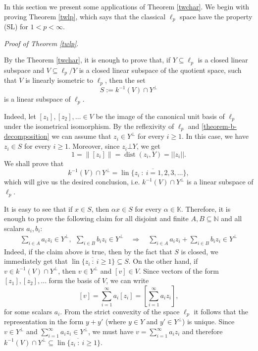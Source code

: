 \documentclass[12pt, reqno]{amsart}
\theoremstyle{definition}
\theoremstyle{remark}
\numberwithin{equation}{section}
\DeclareMathOperator{\dist}{dist}
\DeclareMathOperator{\lin}{lin}
\begin{document}
In this section we present some applications of Theorem \ref{twchar}. We begin with proving Theorem \ref{twlp}, which says that the classical $\ell_p$ space have the property (SL) for $1 < p < \infty$.

\emph{Proof of Theorem \ref{twlp}}.

By the Theorem \ref{twchar},  it is enough to prove that, if $Y \subseteq \ell_p$ is a closed linear subspace and $V \subseteq \ell_p/Y$ is a closed linear subspace of the quotient space, such that $V$ is linearly isometric to $\ell_p$, then the set 
$$S:=k^{-1}(V) \cap Y^{\perp}$$
is a linear subspace of $\ell_p$. 

Indeed, let $[z_1], [z_2], \ldots \in V$ be the image of the canonical unit basis of $\ell_p$ under the isometrical isomorphism. By the reflexivity of $\ell_p$ and \eqref{theorem-b-decomposition} we can assume that $z_i \in Y^{\perp}$ for every $i \geq 1$. In this case, we have $z_i \in S$ for every $i \geq 1$. Moreover, since $z_i\bot Y$, we get
$$1=\big\|[z_i]\big\|=\dist(z_i, Y) = ||z_i||.$$
We shall prove that 
$$k^{-1}(V) \cap Y^{\perp} = \overline{\lin \{ z_i \ : \ i=1,2,3, \ldots \}},$$
which will give us the desired conclusion, i.e. $k^{-1}(V) \cap Y^{\perp}$ is a linear subspace of $\ell_p$.

It is easy to see that if $x \in S$, then $\alpha x \in S$ for every $\alpha \in \mathbb{K}$. Therefore, it is enough to prove the following claim for all disjoint and finite $A, B \subseteq \mathbb{N}$ and all scalars $a_i, b_i$:
\begin{align}
\label{implikacja}
\sum_{i \in A}a_i z_i \in Y^{\perp}, \: \: \sum_{i \in B} b_iz_i \in Y^{\perp}\quad \Rightarrow\quad \sum_{i \in A}a_i z_i + \sum_{i \in B} b_iz_i \in Y^{\perp} 
\end{align}
Indeed, if the claim above is true, then by the fact that $S$ is closed, we immediately get that $\overline{\lin \{ z_i \ : \ i \geq 1 \}} \subseteq S$. On the other hand, if $v \in k^{-1}(V) \cap Y^{\perp}$, then $v \in Y^{\perp}$ and $[v] \in V$. Since vectors of the form $[z_1],[z_2],\ldots$ form the basis of $V$, we can write
$$[v] = \sum_{i=1}^{\infty} a_i [z_i] =  \left [\sum_{i=1}^{\infty} a_iz_i \right ],$$
for some scalars $a_i$. From the strict convexity of the space $\ell_p$ it follows that the representation in the form $y+y'$ (where $y \in Y$ and $y' \in Y^{\perp}$) is unique. Since $v\in Y^{\bot}$ and $\sum_{i=1}^{\infty} a_iz_i\in Y^{\bot}$, we must have $v = \sum_{i=1}^{\infty} a_iz_i$ and therefore $k^{-1}(V) \cap Y^{\perp} \subseteq \overline{\lin \{z_i \ : \ i \geq 1 \}}$.
\end{document}
